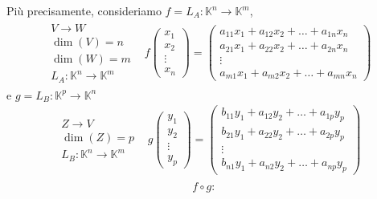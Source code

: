 \documentclass{book}
\begin{document}
Più precisamente, consideriamo $f=L_A:\mathbb{K}^n\to \mathbb{K}^m$,
\begin{eqnarray}
  \begin{matrix}
    V\to W\\
    \dim (V)=n\\
    \dim (W)=m\\
    L_A:\mathbb{K}^n\to \mathbb{K}^m
  \end{matrix} & f
                 \begin{pmatrix}
                   x_1\\
                   x_2\\
                   \vdots\\
                   x_n
                 \end{pmatrix} =
                 \begin{pmatrix}
                   a_{11}x_1+a_{12}x_2+\dots+a_{1n}x_n\\
                   a_{21}x_1+a_{22}x_2+\dots+a_{2n}x_n\\
                   \vdots\\
                   a_{m1}x_1+a_{m2}x_2+\dots+a_{mn}x_n
                 \end{pmatrix}
\end{eqnarray}
e $g=L_B:\mathbb{K}^p\to \mathbb{K}^n$
\begin{eqnarray}
  \begin{matrix}
    Z\to V\\
    \dim (Z)=p\\
    L_B:\mathbb{K}^n\to \mathbb{K}^m
  \end{matrix} & g
                 \begin{pmatrix}
                   y_1\\
                   y_2\\
                   \vdots\\
                   y_p
                 \end{pmatrix} =
                 \begin{pmatrix}
                   b_{11}y_1+a_{12}y_2+\dots+a_{1p}y_p\\
                   b_{21}y_1+a_{22}y_2+\dots+a_{2p}y_p\\
                   \vdots\\
                   b_{n1}y_1+a_{n2}y_2+\dots+a_{np}y_p
                 \end{pmatrix}
\end{eqnarray}
\begin{eqnarray*}
  \begin{matrix}
    f\circ g: & 
  \end{matrix}
\end{eqnarray*}
\end{document}
